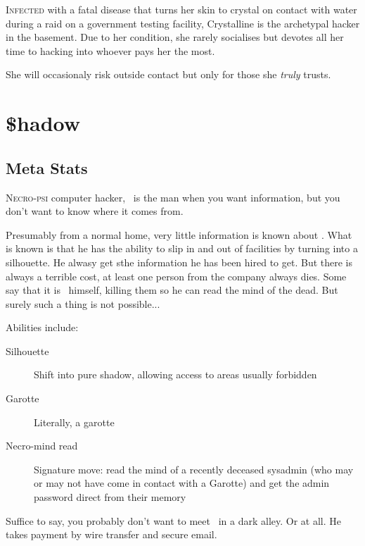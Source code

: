\documentclass[a4paper,onepage]{memoir}
\begin{document}
\begin{npcdescription}
  \lettrine{I}{nfected} with a fatal disease that turns her skin to crystal on
  contact with water during a raid on a government testing facility, Crystalline
  is the archetypal hacker in the basement. Due to her condition, she rarely
  socialises but devotes all her time to hacking into whoever pays her the most.

  She will occasionaly risk outside contact but only for those she \emph{truly}
  trusts.
\end{npcdescription}



\section{\$hadow}

\begin{character*}[shadow]
     

\end{character*}


\subsection{Meta Stats}

\begin{npcdescription}
  \lettrine{N}{ecro-psi} computer hacker, \shadow\ is the man when you want
  information, but you don't want to know where it comes from.

  Presumably from a normal home, very little information is known about \shadow.
  What is known is that he has the ability to slip in and out of facilities by
  turning into a silhouette. He alwasy get sthe information he has been hired to
  get. But there is always a terrible cost, at least one person from the company
  always dies. Some say that it is \shadow\ himself, killing them so he can read
  the mind of the dead. But surely such a thing is not possible...


  Abilities include:
  \begin{description}
  \item[Silhouette] Shift into pure shadow, allowing access to areas usually
    forbidden
  \item[Garotte] Literally, a garotte
  \item[Necro-mind read] Signature move: read the mind of a recently deceased
    sysadmin (who may or may not have come in contact with a Garotte) and get
    the admin password direct from their memory
  \end{description}

  Suffice to say, you probably don't want to meet \shadow\ in a dark alley. Or
  at all. He takes payment by wire transfer and secure email.
\end{npcdescription}
\end{document}
